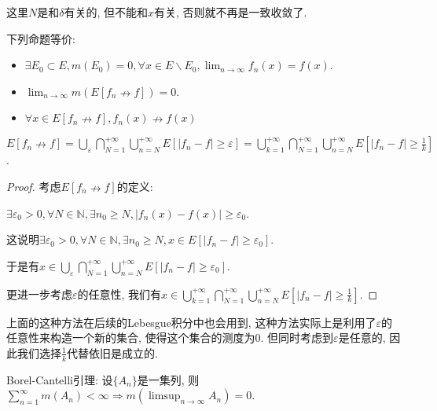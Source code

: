 \documentclass[theorem=false,mathfont=none,openany,sub3section]{easybook}
\begin{document}
\begin{remark}
  这里$N$是和$\delta$有关的, 但不能和$x$有关, 否则就不再是一致收敛了.\par
\end{remark}

\begin{theorem}
  下列命题等价:\par
  \begin{itemize}
    \item $\exists E_0\subset E, m(E_0) = 0, \forall x\in E\backslash E_0, \lim_{n \to \infty}f_n(x)=f(x)$.
    \item $\lim_{n\to \infty}m(E[f_n \nrightarrow f])=0$.
    \item $\forall x\in E[f_n \nrightarrow f], f_n(x)\nrightarrow f(x)$
  \end{itemize}
\end{theorem}

\begin{lemma}
  $E[f_n \nrightarrow f] = \bigcup_{\varepsilon} \bigcap_{N=1}^{+\infty} \bigcup_{n=N}^{+\infty}E\left[\left|f_n-f\right|\geqslant \varepsilon\right] = \bigcup_{k=1}^{+\infty} \bigcap_{N=1}^{+\infty} \bigcup_{n=N}^{+\infty}E\left[\left|f_n-f\right|\geqslant \frac{1}{k}\right]$.
\end{lemma}

\begin{proof}
  考虑$E[f_n \nrightarrow f]$的定义:\par
  $\exists \varepsilon_0>0, \forall N\in \mathbb{N}, \exists n_0\geqslant N, \left|f_n(x)-f(x)\right|\geqslant \varepsilon_0$.\par
  这说明$\exists \varepsilon_0>0, \forall N\in \mathbb{N}, \exists n_0\geqslant N, x\in E\left[\left|f_n-f\right|\geqslant \varepsilon_0\right]$.\par
  于是有$x\in \bigcup_{\varepsilon} \bigcap_{N=1}^{+\infty} \bigcup_{n=N}^{+\infty}E\left[\left|f_n-f\right|\geqslant \varepsilon_0\right]$.\par
  更进一步考虑$\varepsilon$的任意性, 我们有$x \in \bigcup_{k=1}^{+\infty} \bigcap_{N=1}^{+\infty} \bigcup_{n=N}^{+\infty}E\left[\left|f_n-f\right|\geqslant \frac{1}{k}\right]$.\par
\end{proof}

\begin{remark}
  上面的这种方法在后续的Lebesgue积分中也会用到, 这种方法实际上是利用了$\varepsilon$的任意性来构造一个新的集合, 使得这个集合的测度为0. 但同时考虑到$\varepsilon$是任意的, 因此我们选择$\frac{1}{k}$代替依旧是成立的.\par
\end{remark}

\begin{lemma}
  Borel-Cantelli引理: 设$\{A_n\}$是一集列, 则$\sum_{n=1}^{\infty}m(A_n)<\infty \Rightarrow m(\limsup_{n \to \infty}A_n)=0$.
\end{lemma}

\backmatter
\end{document}
